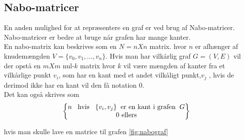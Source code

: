 \subsection{Nabo-matricer}
En anden mulighed for at repræsentere en graf er ved brug af Nabo-matricer. Nabo-matricer er bedre at bruge når grafen har mange kanter.\\
En nabo-matrix kan beskrives som en $N=n X n$ matrix. hvor $n$ er afhænger af knudemængden $V=\{v_0, v_1, \ldots, v_n\}$. Hvis man har vilkårlig graf $G=(V,E)$ vil der opstå en $m X m$ nul-$k$ matrix hvor $k$ vil være mængden af kanter fra et vilkårlige punkt $v_i$, som har en kant med et andet vilkåligt punkt,$v_j$ , hvis de derimod ikke har en kant vil den få notation 0. \\

Det kan også skrives som \\

\begin{equation}
\begin{Bmatrix} 
	 n \hspace{0.3cm}\textrm{hvis} \hspace{0.3cm}\{v_i,v_j\} \hspace{0.2cm} \textrm{er en kant i grafen} \hspace{0.2cm} G \\
	 \textrm{0 ellers} \\
	\end{Bmatrix}
\end{equation}

hvis man skulle lave en matrice til grafen \ref{fig:nabograf} 

	

